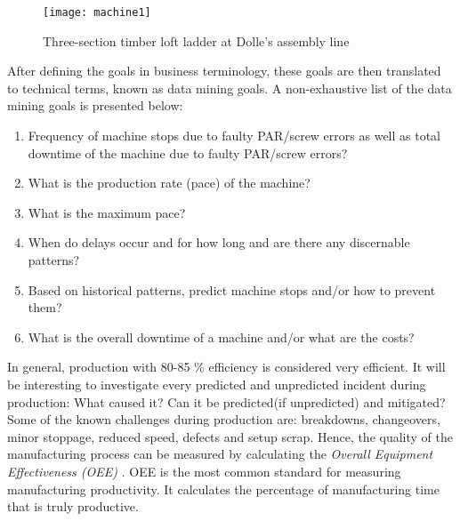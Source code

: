 \documentclass[runningheads]{llncs}
\begin{document}
\begin{figure}
\centering
\texttt{[image: machine1]}
\caption{Three-section timber loft ladder at Dolle's assembly line}
\label{fig:ladder1}
\end{figure}

After defining the goals in business terminology, these goals are then translated to technical terms, known as data mining goals. A non-exhaustive list of the data mining goals is presented below:
\begin{enumerate} 
\item Frequency of machine stops due to faulty PAR/screw errors as well as total downtime of the machine due to faulty PAR/screw errors?
\item What is the production rate (pace) of the machine?
\item What is the maximum pace?
\item When do delays occur and for how long and are there any discernable patterns?
\item Based on historical patterns, predict machine stops and/or how to prevent them?
\item What is the overall downtime of a machine and/or what are the costs?
\end{enumerate} 



\iffalse
In general, production with 80-85 \% efficiency is considered very efficient. It is of interest to look into every predicted and unpredicted incident during production. Why did it happen? Can it be predicted (if unpredicted) and mitigated? How can production be optimised? Some challenges during production are known, such as, breakdowns, changeovers, minor stoppages, reduced speed, defects and setup scrap. As a result, the success of the manufacturing process can be measured by calculating the \textit{Overall Equipment Effectiveness (OEE)} \cite{oee}. OEE is the most widely used standard for measuring manufacturing productivity. 
\fi
In general, production with 80-85 \% efficiency is considered very efficient. It will be interesting to investigate every predicted and unpredicted incident during production: What caused it? Can it be predicted(if unpredicted) and mitigated? Some of the known challenges during production are: breakdowns, changeovers, minor stoppage, reduced speed, defects and setup scrap. Hence, the quality of the manufacturing process can be measured by calculating the \textit{Overall Equipment Effectiveness (OEE)} \cite{oee}. OEE is the most common standard for measuring manufacturing productivity. It calculates the percentage of manufacturing time that is truly productive. 
\end{document}
